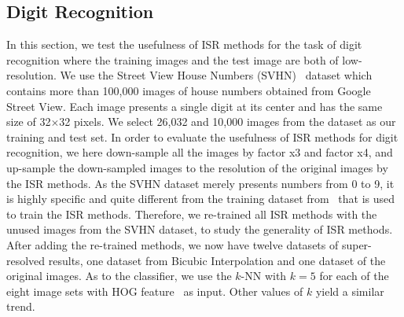 



\subsection{Digit Recognition}
\label{sr:sec:dr}


In this section, we test the usefulness of ISR methods for the task of
digit recognition where the training images and the test image are
both of low-resolution.  We use the Street View House Numbers
(SVHN)~\citep{37648} dataset which contains more than 100,000 images of
house numbers obtained from Google Street View. Each image presents a
single digit at its center and has the same size of 32$\times$32
pixels.  We select 26,032 and 10,000 images from the dataset as our
training and test set.  In order to evaluate the usefulness of ISR
methods for digit recognition, we here down-sample all the images by
factor x3 and factor x4, and up-sample the down-sampled images to the
resolution of the original images by the ISR methods.  As the SVHN
dataset merely presents numbers from 0 to 9, it is highly specific and
quite different from the training dataset from~\citep{Yang-TIP-2010}
that is used to train the ISR methods. Therefore, we re-trained all ISR methods
with the unused images from the SVHN dataset, to study the generality of ISR methods. After adding the
re-trained methods, we now have twelve datasets of super-resolved
results, one dataset from Bicubic Interpolation and one dataset of
the original images. As to the classifier, we use the $k$-NN with $k=5$ for each of the eight
image sets with HOG feature~\citep{Dalal_HoG} as input. Other values of $k$ yield a similar trend.


